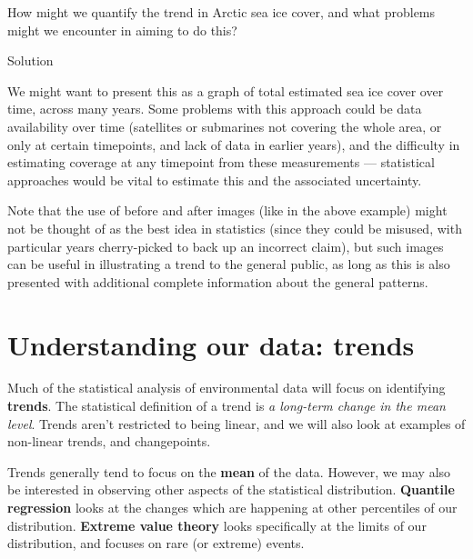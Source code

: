 \documentclass[
  letterpaper,
  DIV=11,
  numbers=noendperiod]{scrartcl}
\begin{document}
\begin{tcolorbox}[enhanced jigsaw, opacityback=0, coltitle=black, opacitybacktitle=0.6, breakable, toprule=.15mm, bottomtitle=1mm, title={Exercise 5}, colback=white, leftrule=.75mm, titlerule=0mm, toptitle=1mm, arc=.35mm, bottomrule=.15mm, rightrule=.15mm, colframe=quarto-callout-tip-color-frame, colbacktitle=quarto-callout-tip-color!10!white, left=2mm]

How might we quantify the trend in Arctic sea ice cover, and what
problems might we encounter in aiming to do this?

Solution

We might want to present this as a graph of total estimated sea ice
cover over time, across many years. Some problems with this approach
could be data availability over time (satellites or submarines not
covering the whole area, or only at certain timepoints, and lack of data
in earlier years), and the difficulty in estimating coverage at any
timepoint from these measurements --- statistical approaches would be
vital to estimate this and the associated uncertainty.

Note that the use of before and after images (like in the above example)
might not be thought of as the best idea in statistics (since they could
be misused, with particular years cherry-picked to back up an incorrect
claim), but such images can be useful in illustrating a trend to the
general public, as long as this is also presented with additional
complete information about the general patterns.

\end{tcolorbox}

\section{Understanding our data:
trends}\label{understanding-our-data-trends}

Much of the statistical analysis of environmental data will focus on
identifying \textbf{trends}. The statistical definition of a trend is
\emph{a long-term change in the mean level}. Trends aren't restricted to
being linear, and we will also look at examples of non-linear trends,
and changepoints.

Trends generally tend to focus on the \textbf{mean} of the data.
However, we may also be interested in observing other aspects of the
statistical distribution. \textbf{Quantile regression} looks at the
changes which are happening at other percentiles of our distribution.
\textbf{Extreme value theory} looks specifically at the limits of our
distribution, and focuses on rare (or extreme) events.
\end{document}
